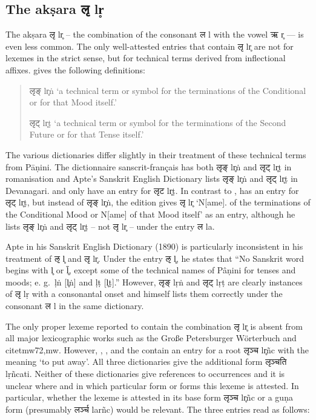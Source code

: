 \subsection{The akṣara {\devhmfont लृ} lr̥}

The akṣara {\devfont लृ} lr̥ – the combination of the consonant {\devfont ल} l with the vowel {\devfont ऋ} r̥ — is even less common. The only well-attested entries that contain {\devfont लृ} lr̥ are not for lexemes in the strict sense, but for technical terms derived from inflectional affixes. \citet{mw72} gives the following definitions:

\begin{quote}
{\devbfont लृङ्} lr̥ṅ ‘a technical term or symbol for the terminations of the Conditional or for that Mood itself.’ 

{\devbfont लृट्} lr̥ṭ ‘a technical term or symbol for the terminations of the Second Future or for that Tense itself.’ 
\end{quote}


The various dictionaries differ slightly in their treatment of these technical terms from Pāṇini. The dictionnaire sanscrit-français \citep{stc} has both {\devfont लृङ्} lr̥ṅ and {\devfont लृट्} lr̥ṭ  in romanisation and Apte’s Sanskrit English Dictionary \citep{ap90} lists {\devfont लृङ्} lr̥ṅ and {\devfont लृट्} lr̥ṭ in Devanagari. \citet{ccs,cae}  and \citet{md} only have an entry for {\devfont लृट} lr̥ṭ. In contrast to \citet{mw72}, \citet{mw} has an entry for {\devfont लृट्} lr̥ṭ, but instead of {\devfont लृङ्} lr̥ṅ, the \citet{mw} edition gives {\devfont लृ} lr̥ ‘N[ame]. of the terminations of the Conditional Mood or N[ame] of that Mood itself’ as an entry, although he lists {\devfont लृङ्} lr̥ṅ and {\devfont लृट्} lr̥ṭ – not {\devfont लृ} lr̥ – under the entry {\devfont ल} la. 

Apte in his Sanskrit English Dictionary (1890) is particularly inconsistent in his treatment of {\devfont ऌ} l̥ and {\devfont लृ} lr̥. Under the entry {\devfont ऌ} l̥, he states that “No Sanskrit word begins with l̥ or l̥̄, except some of the technical names of Pâṇini for tenses and moods; e. g.~ḷṅ [l̥ṅ] and ḷṭ [l̥ṭ].” However, {\devfont लृङ्} lṛṅ  and {\devfont लृट्} lṛṭ are clearly instances of {\devfont लृ} lṛ with a consonantal onset and \citet{ap90} himself lists them correctly under the consonant {\devfont ल} l in the same dictionary.

The only proper lexeme reported to contain the combination {\devfont लृ} lr̥ is absent from all major lexicographic works such as the Große Petersburger Wörterbuch \citep{pwg} and citet{mw72,mw}.  However, \citet{wil}, \citet{yat}, and the \citet{shs} contain an entry for a root {\devfont लृञ्च} lr̥ñc with the meaning ‘to put away’. All three dictionaries give the additional form {\devfont लृञ्चति}  lṛñcati. Neither of these dictionaries give references to occurrences and it is unclear where and in which particular form or forms this lexeme is attested. In particular, whether the lexeme is attested in its base form {\devfont लृञ्च} lr̥ñc or a guṇa form (presumably {\devfont लर्ञ्च} larñc) would be relevant. The three entries read as follows:

